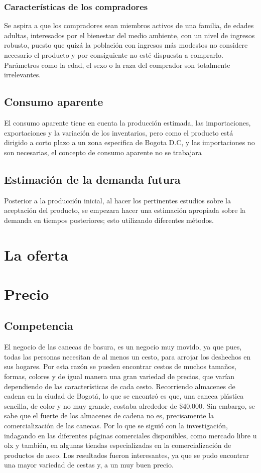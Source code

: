 \documentclass{report}
\begin{document}
    \subsection{Características de los compradores}
    Se aspira a que los compradores sean miembros activos de una familia, de edades adultas, interesados por el bienestar del medio ambiente, con un nivel de ingresos robusto, puesto que quizá la población con ingresos más modestos no considere necesario el producto y por consiguiente no esté dispuesta a comprarlo. Parámetros como la edad, el sexo o la raza del comprador son totalmente irrelevantes. 
    
    \section{Consumo aparente}
    El consumo aparente tiene en cuenta la producción estimada, las importaciones, exportaciones y la variación de los inventarios, pero como el producto está dirigido a corto plazo a un zona especifica de Bogota D.C, y las importaciones no son necesarias, el concepto de consumo aparente no se trabajara
    
    \section{Estimación de la demanda futura}
    Posterior a la producción inicial, al hacer los pertinentes estudios sobre la aceptación del producto, se empezara hacer una estimación apropiada sobre la demanda en tiempos posteriores; esto utilizando diferentes métodos.

\chapter{La oferta}
    
\chapter{Precio}
    
    \section{Competencia}
    El negocio de las canecas de basura, es un negocio muy movido, ya que pues, todas las personas necesitan de al menos un cesto, para arrojar los deshechos en sus hogares. Por esta razón se pueden encontrar cestos de muchos tamaños, formas, colores y de igual manera una gran variedad de precios, que varían dependiendo de las características de cada cesto.
Recorriendo almacenes de cadena en la ciudad de Bogotá, lo que se encontró es que, una caneca plástica sencilla, de color y no muy grande, costaba alrededor de \$40.000. Sin embargo, se sabe que el fuerte de los almacenes de cadena no es, precisamente la comercialización de las canecas.
 Por lo que se siguió con la investigación, indagando en las diferentes páginas comerciales disponibles, como mercado libre u olx y también, en algunas tiendas especializadas en la comercialización de productos de aseo. Los resultados fueron interesantes, ya que se pudo encontrar una mayor variedad de cestas y, a un muy buen precio.
 
\end{document}
